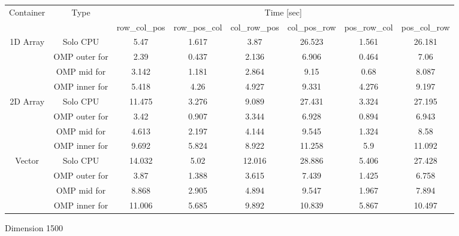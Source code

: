 \begin{tabular}{ |c|c|c|c|c|c|c|c|  }
\hline 
\multirow{2}{*}{Container}  & \multirow{2}{*}{Type} & \multicolumn{6}{c|}{ Time [sec] } \\  \cline{3-8}

                          & & row\_col\_pos & row\_pos\_col & col\_row\_pos & col\_pos\_row  & pos\_row\_col & pos\_col\_row \\
\hline 
\multirow{4}{*}{1D Array}   & Solo CPU &  5.47 &1.617 &3.87 &26.523 &1.561 &26.181 \\
                            & OMP outer for & 2.39 &0.437 &2.136 &6.906 &0.464 &7.06 \\
                            & OMP mid for & 3.142 &1.181 &2.864 &9.15 &0.68 &8.087 \\
                            & OMP inner for & 5.418 &4.26 &4.927 &9.331 &4.276 &9.197 \\

\hline 
\multirow{4}{*}{2D Array}  
                            & Solo CPU      & 11.475 & 3.276 &9.089 &27.431 &3.324 &27.195 \\
                            & OMP outer for & 3.42   &0.907 &3.344 &6.928 &0.894 &6.943 \\
                            & OMP mid for   & 4.613  &2.197 &4.144 &9.545 &1.324 &8.58 \\
                            & OMP inner for & 9.692  &5.824 &8.922 &11.258 &5.9 &11.092 \\

\hline 
\multirow{4}{*}{Vector}     
                            & Solo CPU      & 14.032 &5.02 &12.016 &28.886 &5.406 &27.428 \\                           
                            & OMP outer for & 3.87 &1.388 &3.615 &7.439 &1.425 &6.758 \\
                            & OMP mid for   & 8.868 &2.905 &4.894 &9.547 &1.967 &7.894 \\
                            & OMP inner for & 11.006 &5.685 &9.892 &10.839 &5.867 &10.497 \\  
\hline
\end{tabular}
\caption{ Dimension 1500 }
\label{table1pc}
